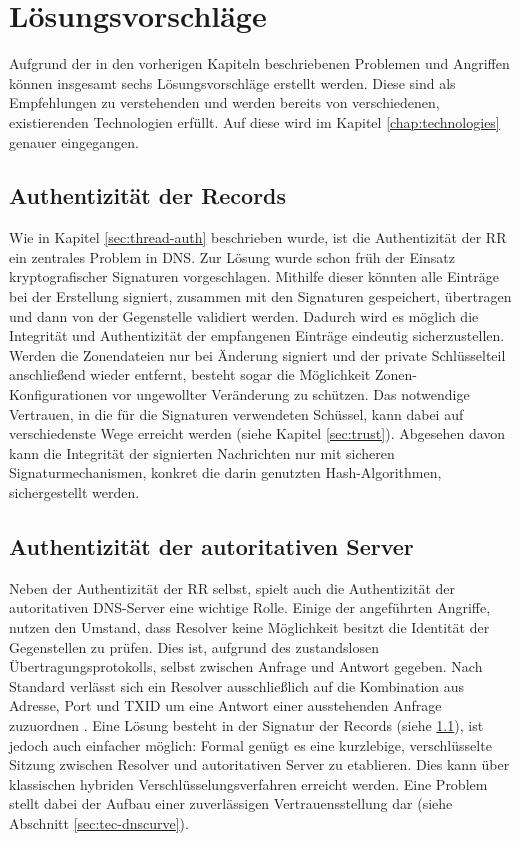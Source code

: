 \chapter{Lösungsvorschläge}
\label{chap:solutions}
Aufgrund der in den vorherigen Kapiteln beschriebenen Problemen und Angriffen können insgesamt sechs Lösungsvorschläge erstellt werden. Diese sind als Empfehlungen zu verstehenden und werden bereits von verschiedenen, existierenden Technologien erfüllt. Auf diese wird im Kapitel \ref{chap:technologies} genauer eingegangen.

\section{Authentizität der Records}
\label{sec:solution-recordauth}
Wie in Kapitel \ref{sec:thread-auth} beschrieben wurde, ist die Authentizität der RR ein zentrales Problem in DNS. Zur Lösung wurde schon früh der Einsatz kryptografischer Signaturen vorgeschlagen. Mithilfe dieser könnten alle Einträge bei der Erstellung signiert, zusammen mit den Signaturen gespeichert, übertragen und dann von der Gegenstelle validiert werden. Dadurch wird es möglich die Integrität und Authentizität der empfangenen Einträge eindeutig sicherzustellen. Werden die Zonendateien nur bei Änderung signiert und der private Schlüsselteil anschließend wieder entfernt, besteht sogar die Möglichkeit Zonen-Konfigurationen vor ungewollter Veränderung zu schützen. Das notwendige Vertrauen, in die für die Signaturen verwendeten Schüssel, kann dabei auf verschiedenste Wege erreicht werden (siehe Kapitel \ref{sec:trust}). Abgesehen davon kann die Integrität der signierten Nachrichten nur mit sicheren Signaturmechanismen, konkret die darin genutzten Hash-Algorithmen, sichergestellt werden\cite{Stevens2017}. 

\section{Authentizität der autoritativen Server}
Neben der Authentizität der RR selbst, spielt auch die Authentizität der autoritativen DNS-Server eine wichtige Rolle. Einige der angeführten Angriffe, nutzen den Umstand, dass Resolver keine Möglichkeit besitzt die Identität der Gegenstellen zu prüfen. Dies ist, aufgrund des zustandslosen Übertragungsprotokolls, selbst zwischen Anfrage und Antwort gegeben. Nach Standard verlässt sich ein Resolver ausschließlich auf die Kombination aus Adresse, Port und TXID um eine Antwort einer ausstehenden Anfrage zuzuordnen \cite{rfc1035}. Eine Lösung besteht in der Signatur der Records (siehe \ref{sec:solution-recordauth}), ist jedoch auch einfacher möglich: Formal genügt es eine kurzlebige, verschlüsselte Sitzung zwischen Resolver und autoritativen Server zu etablieren. Dies kann über klassischen hybriden Verschlüsselungsverfahren erreicht werden. Eine Problem stellt dabei der Aufbau einer zuverlässigen Vertrauensstellung dar (siehe Abschnitt \ref{sec:tec-dnscurve}).

